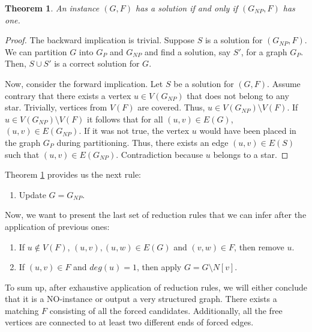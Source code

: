 \documentclass[en]{pracamgr}
\newtheorem{theorem}{Theorem}
\begin{document}
\begin{theorem}\label{GNP partition}
	An instance $(G,F)$ has a solution if and only if $(G_{NP},F)$ has one.
\end{theorem}

\begin{proof}
	The backward implication is trivial. Suppose $S$ is a solution for $(G_{NP},F)$. We can partition $G$ into $G_P$ and $G_{NP}$ and find a solution, say $S'$, for a graph $G_P$. Then, $S \cup S'$ is a correct solution for $G$.
	
	Now, consider the forward implication. Let $S$ be a solution for $(G, F)$. Assume contrary that there exists a vertex $u \in V(G_{NP})$ that does not belong to any star. Trivially, vertices from $V(F)$ are covered. Thus, $u \in V(G_{NP}) \setminus V(F)$. If $u \in V(G_{NP}) \setminus V(F)$ it follows that for all $(u,v) \in E(G)$, $(u,v) \in E(G_{NP})$. If it was not true, the vertex $u$ would have been placed in the graph $G_P$ during partitioning. Thus, there exists an edge $(u,v) \in E(S)$ such that $(u,v) \in E(G_{NP})$. Contradiction because $u$ belongs to a star.
	
\end{proof}

Theorem \ref{GNP partition} provides us the next rule:

\begin{enumerate}[leftmargin=*,label=\textbf{Reduction \arabic{enumi}},resume]
	\item Update $G = G_{NP}$.
\end{enumerate}

Now, we want to present the last set of reduction rules that we can infer after the application of previous ones:

\begin{enumerate}[leftmargin=*,label=\textbf{Reduction \arabic{enumi}},resume]
	\item If $u \notin V(F)$, $(u,v),(u,w) \in E(G)$ and $(v,w) \in F$, then remove $u$.
	\item If $(u,v) \in F$ and $deg(u)=1$, then apply $G = G \setminus N[v]$.
\end{enumerate}

To sum up, after exhaustive application of reduction rules, we will either conclude that it is a NO-instance or output a very structured graph. There exists a matching $F$ consisting of all the forced candidates. Additionally, all the free vertices are connected to at least two different ends of forced edges.
\end{document}
